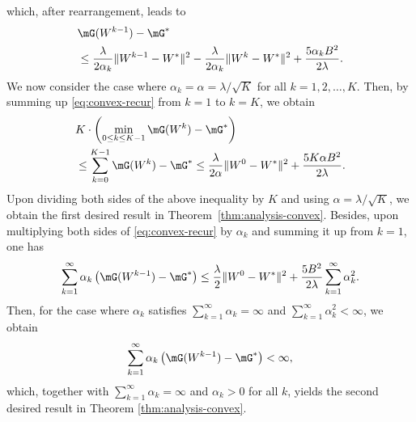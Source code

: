 which, after rearrangement, leads to
\begin{equation}\label{eq:convex-recur}
\begin{aligned}
& \mG(W^{k-1}) - \mG^* \\
& \leq \frac{\lambda}{2\alpha_k}\|W^{k-1} - W^*\|^2 - \frac{\lambda}{2\alpha_k}\|W^k - W^*\|^2 + \frac{5\alpha_kB^2}{2\lambda}. 
\end{aligned}
\end{equation}
We now consider the case where $\alpha_k = \alpha = \lambda/\sqrt{K}$ for all $k=1,2,\dots,K$. Then, by summing up \eqref{eq:convex-recur} from $k=1$ to $k=K$, we obtain
$$ 
\begin{aligned}
& K\cdot \left(\min_{0\leq k\leq K-1} \mG(W^k) - \mG^*\right) \\
& \leq \sum_{k=0}^{K-1} \mG(W^k) - \mG^* \leq \frac{\lambda}{2\alpha}\|W^0 - W^*\|^2 + \frac{5K\alpha B^2}{2\lambda}. 
\end{aligned}
$$
Upon dividing both sides of the above inequality by $K$ and using $\alpha = \lambda/\sqrt{K}$, we obtain the first desired result in Theorem~\ref{thm:analysis-convex}. Besides, upon multiplying both sides of \eqref{eq:convex-recur} by $\alpha_k$ and summing it up from $k=1$, one has
$$ \sum_{k=1}^\infty \alpha_k\left(\mG(W^{k-1}) - \mG^*\right) \leq \frac{\lambda}{2}\|W^0 - W^*\|^2 + \frac{5B^2}{2\lambda}\sum_{k=1}^\infty\alpha_k^2. $$
Then, for the case where $\alpha_k$ satisfies $\sum_{k=1}^\infty\alpha_k = \infty$ and $\sum_{k=1}^\infty\alpha_k^2 < \infty$, we obtain
$$ \sum_{k=1}^\infty \alpha_k\left(\mG(W^{k-1}) - \mG^*\right) < \infty, $$
which, together with $\sum_{k=1}^\infty\alpha_k = \infty$ and $\alpha_k>0$ for all $k$, yields the second desired result in Theorem \ref{thm:analysis-convex}.



